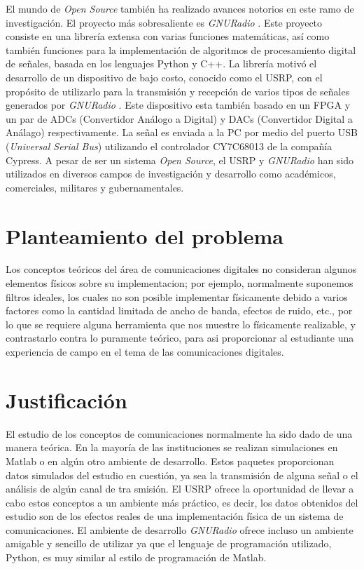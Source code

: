 El mundo de \emph{Open Source} tambi\'en ha realizado avances notorios en este ramo de investigaci\'on. El proyecto m\'as
sobresaliente es \emph{GNURadio} \cite{radio}. Este proyecto consiste en una librer\'ia extensa con varias funciones
matem\'aticas, as\'i como tambi\'en funciones para la implementaci\'on de algoritmos de procesamiento digital de se\~nales,
basada en los lenguajes Python y C++. La librer\'ia motiv\'o el desarrollo de un dispositivo de bajo costo, conocido
como el USRP, con el prop\'osito de utilizarlo para la transmisi\'on y recepci\'on de varios tipos de se\~nales generados
por \emph{GNURadio} \cite{ettus}. Este dispositivo esta tambi\'en basado en un FPGA y un par de ADCs (Convertidor An\'alogo
a Digital) y DACs (Convertidor Digital a An\'alago) respectivamente. La se\~nal es enviada a la PC por medio del puerto USB
(\emph{Universal Serial Bus}) utilizando el controlador CY7C68013 de la compa\~n\'ia Cypress. A pesar de ser un sistema
\emph{Open Source}, el USRP y \emph{GNURadio} han sido utilizados en diversos campos de investigaci\'on y desarrollo como
acad\'emicos, comerciales, militares y gubernamentales.

\section{Planteamiento del problema}
Los conceptos te\'oricos del \'area de comunicaciones digitales no consideran algunos elementos f\'isicos sobre su
implementacion; por ejemplo, normalmente suponemos filtros ideales, los cuales no son posible implementar f\'isicamente
debido a varios factores como la cantidad limitada de ancho de banda, efectos de ruido, etc., por lo que se requiere alguna
herramienta que nos muestre lo f\'isicamente realizable, y contrastarlo contra lo puramente te\'orico, para asi proporcionar
al estudiante una experiencia de campo en el tema de las comunicaciones digitales.

\section{Justificaci\'on}

El estudio de los conceptos de comunicaciones normalmente ha sido dado de una manera te\'orica. En la mayor\'ia de las
instituciones se realizan simulaciones en Matlab o en alg\'un otro ambiente de desarrollo. Estos paquetes proporcionan datos
simulados del estudio en cuesti\'on, ya sea la transmisi\'on de alguna se\~nal o el an\'alisis de alg\'un canal de tra
smisi\'on. El USRP ofrece la oportunidad de llevar a cabo estos conceptos a un ambiente m\'as pr\'actico, es decir, los
datos obtenidos del estudio son de los efectos reales de una implementaci\'on f\'isica de un sistema de comunicaciones. El
ambiente de desarrollo \emph{GNURadio} ofrece incluso un ambiente amigable y sencillo de utilizar ya que el lenguaje de
programaci\'on utilizado, Python, es muy similar al estilo de programaci\'on de Matlab.

